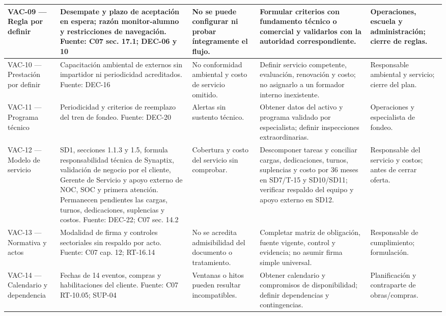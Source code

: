 \begin{longtable}{|L{0.116466\AnchoTablaAnexo}|L{0.297189\AnchoTablaAnexo}|L{0.168675\AnchoTablaAnexo}|L{0.281124\AnchoTablaAnexo}|L{0.136546\AnchoTablaAnexo}|}
VAC-09 — Regla por definir & Desempate y plazo de aceptación en espera; razón monitor-alumno y restricciones de navegación. Fuente: C07 sec. 17.1; DEC-06 y 10 & No se puede configurar ni probar íntegramente el flujo. & Formular criterios con fundamento técnico o comercial y validarlos con la autoridad correspondiente. & Operaciones, escuela y administración; cierre de reglas. \\ \hline
VAC-10 — Prestación por definir & Capacitación ambiental de externos sin impartidor ni periodicidad acreditados. Fuente: DEC-16 & No conformidad ambiental y costo de servicio omitido. & Definir servicio competente, evaluación, renovación y costo; no asignarlo a un formador interno inexistente. & Responsable ambiental y servicio; cierre del plan. \\ \hline
{}
VAC-11 — Programa técnico & Periodicidad y criterios de reemplazo del tren de fondeo. Fuente: DEC-20 & Alertas sin sustento técnico. & Obtener datos del activo y programa validado por especialista; definir inspecciones extraordinarias. & Operaciones y especialista de fondeo. \\ \hline
VAC-12 — Modelo de servicio & SD1, secciones 1.1.3 y 1.5, formula responsabilidad técnica de Synaptix, validación de negocio por el cliente, Gerente de Servicio y apoyo externo de NOC, SOC y primera atención. Permanecen pendientes las cargas, turnos, dedicaciones, suplencias y costos. Fuente: DEC-22; C07 sec. 14.2 & Cobertura y costo del servicio sin comprobar. & Descomponer tareas y conciliar cargas, dedicaciones, turnos, suplencias y costo por 36 meses en SD7/T-15 y SD10/SD11; verificar respaldo del equipo y apoyo externo en SD12. & Responsable del servicio y costos; antes de cerrar oferta. \\ \hline
{}
VAC-13 — Normativa y actos & Modalidad de firma y controles sectoriales sin respaldo por acto. Fuente: C07 cap. 12; RT-16.14 & No se acredita admisibilidad del documento o tratamiento. & Completar matriz de obligación, fuente vigente, control y evidencia; no asumir firma simple universal. & Responsable de cumplimiento; formulación. \\ \hline
VAC-14 — Calendario y dependencia & Fechas de 14 eventos, compras y habilitaciones del cliente. Fuente: C07 RT-10.05; SUP-04 & Ventanas o hitos pueden resultar incompatibles. & Obtener calendario y compromisos de disponibilidad; definir dependencias y contingencias. & Planificación y contraparte de obras/compras. \\ \hline

\end{longtable}
